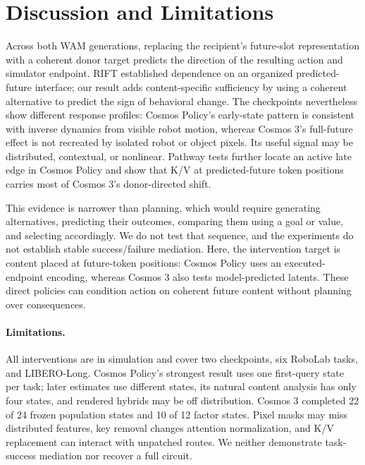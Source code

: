 \documentclass{article}
\newcommand{\kv}{K/V}
\begin{document}
\FloatBarrier
\section{Discussion and Limitations}
\label{sec:discussion}

Across both WAM generations, replacing the recipient's future-slot representation with a coherent donor target predicts the direction of the resulting action and simulator endpoint. RIFT established dependence on an organized predicted-future interface; our result adds content-specific sufficiency by using a coherent alternative to predict the sign of behavioral change. The checkpoints nevertheless show different response profiles: Cosmos Policy's early-state pattern is consistent with inverse dynamics from visible robot motion, whereas Cosmos 3's full-future effect is not recreated by isolated robot or object pixels. Its useful signal may be distributed, contextual, or nonlinear. Pathway tests further locate an active late edge in Cosmos Policy and show that K/V at predicted-future token positions carries most of Cosmos 3's donor-directed shift.

This evidence is narrower than planning, which would require generating alternatives, predicting their outcomes, comparing them using a goal or value, and selecting accordingly. We do not test that sequence, and the experiments do not establish stable success/failure mediation. Here, the intervention target is content placed at future-token positions: Cosmos Policy uses an executed-endpoint encoding, whereas Cosmos 3 also tests model-predicted latents. These direct policies can condition action on coherent future content without planning over consequences.

\paragraph{Limitations.}
All interventions are in simulation and cover two checkpoints, six RoboLab tasks, and LIBERO-Long. Cosmos Policy's strongest result uses one first-query state per task; later estimates use different states, its natural content analysis has only four states, and rendered hybrids may be off distribution. Cosmos 3 completed 22 of 24 frozen population states and 10 of 12 factor states. Pixel masks may miss distributed features, key removal changes attention normalization, and \kv{} replacement can interact with unpatched routes. We neither demonstrate task-success mediation nor recover a full circuit.
\end{document}

